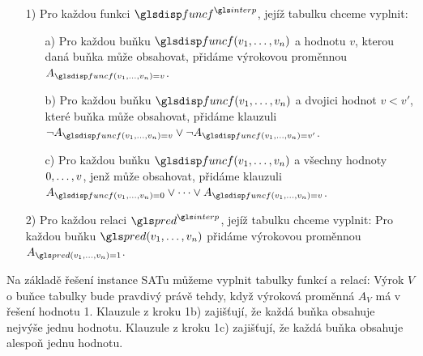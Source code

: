 \begin{itemize}
\item[1)] Pro každou funkci $\func^\interp$, jejíž tabulku chceme vyplnit:
  \begin{itemize}
  \item[a)] Pro každou buňku $\func(v_1 \comdots v_n)$ a hodnotu $v$,
    kterou daná buňka může obsahovat, přidáme výrokovou proměnnou
    $A_{\func(v_1 \comdots v_n) = v}$.
  \item[b)] Pro každou buňku $\func(v_1 \comdots v_n)$
    a dvojici hodnot $v < v'$,
    které buňka může obsahovat, přidáme klauzuli
    $\neg A_{\func(v_1 \comdots v_n) = v} \vee \neg A_{\func(v_1 \comdots v_n) = v'}$.
  \item[c)] Pro každou buňku $\func(v_1 \comdots v_n)$ a všechny hodnoty
    $0 , \ldots, v$, jenž může obsahovat, přidáme klauzuli
    $A_{\func(v_1 \comdots v_n) = 0} \vee \cdots \vee A_{\func(v_1 \comdots v_n) = v}$.
  \end{itemize}
\item[2)] Pro každou relaci $\pred^\interp$, jejíž tabulku chceme vyplnit: Pro
  každou buňku $\pred(v_1 \comdots v_n)$ přidáme výrokovou proměnnou
  $A_{\pred(v_1 \comdots v_n) = 1}$.
\end{itemize}

Na základě řešení instance SATu můžeme vyplnit tabulky funkcí a relací:
Výrok $V$ o buňce tabulky bude pravdivý právě tehdy,
když výroková proměnná $A_V$ má v řešení hodnotu 1.
Klauzule z kroku 1b) zajišťují, že každá buňka obsahuje
nejvýše jednu hodnotu. Klauzule z kroku 1c) zajišťují, že každá
buňka obsahuje alespoň jednu hodnotu.

